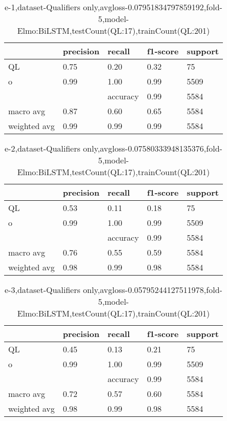 \begin{table}[!ht] 
\centering
\caption{e-1,dataset-Qualifiers only,avgloss-0.07951834797859192,fold-5,model-Elmo:BiLSTM,testCount(QL:17),trainCount(QL:201)}\label{e-1data-qualS.tsv}
\begin{tabularx}{300pt}{|X|X|X|X|X|}
\hline
&precision&recall&f1-score&support\\
\hline
QL&0.75&0.20&0.32&75\\
\hline
o&0.99&1.00&0.99&5509\\
\hline
&&accuracy&0.99&5584\\
\hline
macro avg&0.87&0.60&0.65&5584\\
\hline
weighted avg&0.99&0.99&0.99&5584\\
\hline
\end{tabularx}
\end{table}
\begin{table}[!ht] 
\centering
\caption{e-2,dataset-Qualifiers only,avgloss-0.07580333948135376,fold-5,model-Elmo:BiLSTM,testCount(QL:17),trainCount(QL:201)}\label{e-2data-qualS.tsv}
\begin{tabularx}{300pt}{|X|X|X|X|X|}
\hline
&precision&recall&f1-score&support\\
\hline
QL&0.53&0.11&0.18&75\\
\hline
o&0.99&1.00&0.99&5509\\
\hline
&&accuracy&0.99&5584\\
\hline
macro avg&0.76&0.55&0.59&5584\\
\hline
weighted avg&0.98&0.99&0.98&5584\\
\hline
\end{tabularx}
\end{table}
\begin{table}[!ht] 
\centering
\caption{e-3,dataset-Qualifiers only,avgloss-0.05795244127511978,fold-5,model-Elmo:BiLSTM,testCount(QL:17),trainCount(QL:201)}\label{e-3data-qualS.tsv}
\begin{tabularx}{300pt}{|X|X|X|X|X|}
\hline
&precision&recall&f1-score&support\\
\hline
QL&0.45&0.13&0.21&75\\
\hline
o&0.99&1.00&0.99&5509\\
\hline
&&accuracy&0.99&5584\\
\hline
macro avg&0.72&0.57&0.60&5584\\
\hline
weighted avg&0.98&0.99&0.98&5584\\
\hline
\end{tabularx}
\end{table}
